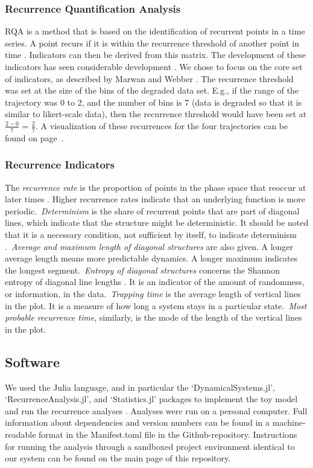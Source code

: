 \documentclass[utf8]{FrontiersinVancouver}
\begin{document}
\subsubsection{Recurrence Quantification Analysis}
RQA is a method that is based on the identification of recurrent points in a time series. A point recurs if it is within the recurrence threshold of another point in time \citep{webber2005recurrence}. Indicators can then be derived from this matrix. The development of these indicators has seen considerable development \citep{marwanTrendsRecurrenceAnalysis2023}. We chose to focus on the core set of indicators, as described by Marwan and Webber \citep{marwanMathematicalComputationalFoundations2015}. The recurrence threshold was set at the size of the bins of the degraded data set. E.g., if the range of the trajectory was 0 to 2, and the number of bins is 7 (data is degraded so that it is similar to likert-scale data), then the recurrence threshold would have been set at $\frac{2-0}{7}$ = $\frac{2}{7}$. A visualization of these recurrences for the four trajectories can be found on page~\pageref{fig:2}.

\subsubsection{Recurrence Indicators}
The \textit{recurrence rate} is the proportion of points in the phase space that reoccur at later times \citep{webber2005recurrence}. Higher recurrence rates indicate that an underlying function is more periodic.\ \textit{Determinism} is the share of recurrent points that are part of diagonal lines, which indicate that the structure might be deterministic. It should be noted that it is a necessary condition, not sufficient by itself, to indicate determinism \citep{marwanHowAvoidPotential2011}.\ \textit{Average and maximum length of diagonal structures} are also given. A longer average length means more predictable dynamics. A longer maximum indicates the longest segment.\ \textit{Entropy of diagonal structures} concerns the Shannon entropy of diagonal line lengths \citep{kraemerRecurrenceThresholdSelection2018}. It is an indicator of the amount of randomness, or information, in the data.\ \textit{Trapping time} is the average length of vertical lines in the plot. It is a measure of how long a system stays in a particular state.\ \textit{Most probable recurrence time}, similarly, is the mode of the length of the vertical lines in the plot. 

\subsection{Software}
We used the Julia language, and in particular the `DynamicalSystems.jl', `RecurrenceAnalysis.jl', and `Statistics.jl' packages to implement the toy model and run the recurrence analyses \citep{bezanson2017julia, Datseris2018, DatserisParlitz2022}. Analyses were run on a personal computer. Full information about dependencies and version numbers can be found in a machine-readable format in the Manifest.toml file in the Github-repository. Instructions for running the analysis through a sandboxed project environment identical to our system can be found on the main page of this repository.
\end{document}
